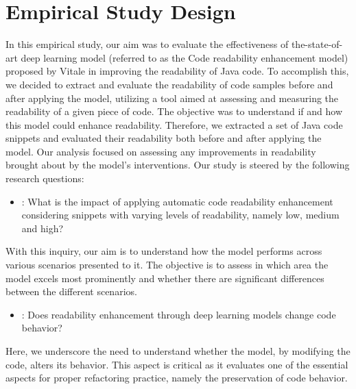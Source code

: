 \chapter{Empirical Study Design}
\label{Chapter3}
In this empirical study, our aim was to evaluate the effectiveness of the-state-of-art deep learning model (referred to as the Code readability enhancement model) proposed by Vitale \etal \cite{Vitale2023} in improving the readability of Java code. To accomplish this, we decided to extract and evaluate the readability of code samples before and after applying the model, utilizing a tool aimed at assessing and measuring the readability of a given piece of code. The objective was to understand if and how this model could enhance readability. Therefore, we extracted a set of Java code snippets and evaluated their readability both before and after applying the model. Our analysis focused on assessing any improvements in readability brought about by the model's interventions.\newline
Our study is steered by the following research questions:
\begin{itemize}
	\item {}: What is the impact of applying automatic code readability enhancement considering snippets with varying levels of readability, namely low, medium and high?
\end{itemize}
With this inquiry, our aim is to understand how the model performs across various scenarios presented to it. The objective is to assess in which area the model excels most prominently and whether there are significant differences between the different scenarios.

\begin{itemize}
	\item {}: Does readability enhancement through deep learning models change code behavior?
\end{itemize}
Here, we underscore the need to understand whether the model, by modifying the code, alters its behavior. This aspect is critical as it evaluates one of the essential aspects for proper refactoring practice, namely the preservation of code behavior.
